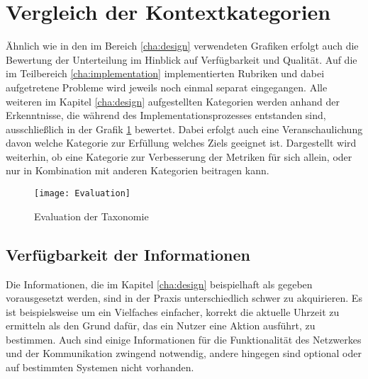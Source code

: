 \section{Vergleich der Kontextkategorien} 
Ähnlich wie in den im Bereich \ref{cha:design} verwendeten Grafiken erfolgt auch die Bewertung der Unterteilung im Hinblick auf Verfügbarkeit und Qualität. Auf die im Teilbereich \ref{cha:implementation} implementierten Rubriken und dabei aufgetretene Probleme wird jeweils noch einmal separat eingegangen. Alle weiteren im Kapitel \ref{cha:design} aufgestellten Kategorien werden anhand der Erkenntnisse, die während des Implementationsprozesses entstanden sind, ausschließlich in der Grafik \ref{Tax_Ev_1} bewertet. Dabei erfolgt auch eine Veranschaulichung davon welche Kategorie zur Erfüllung welches Ziels geeignet ist. Dargestellt wird weiterhin, ob eine Kategorie zur Verbesserung der Metriken für sich allein, oder nur in Kombination mit anderen Kategorien beitragen kann.
\begin{figure}[H]
\texttt{[image: Evaluation]}
\caption{Evaluation der Taxonomie}
\label{Tax_Ev_1}
\end{figure}

\subsection{Verfügbarkeit der Informationen}
Die Informationen, die im Kapitel \ref{cha:design} beispielhaft als gegeben vorausgesetzt werden, sind in der Praxis unterschiedlich schwer zu akquirieren. Es ist beispielsweise um ein Vielfaches einfacher, korrekt die aktuelle Uhrzeit zu ermitteln als den Grund dafür, das ein Nutzer eine Aktion ausführt, zu bestimmen. Auch sind einige Informationen für die Funktionalität des Netzwerkes und der Kommunikation zwingend notwendig, andere hingegen sind optional oder auf bestimmten Systemen nicht vorhanden.

